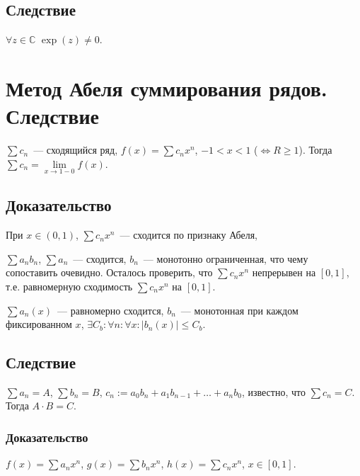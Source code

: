 \documentclass{article}
\begin{document}
        \subsection{Следствие}
        
            $\forall z \in \mathbb{C}$ $\exp(z) \neq 0$.
            
    \newpage
    
    \section{Метод Абеля суммирования рядов. Следствие}
    
        $\sum c_n$~--- сходящийся ряд, $f(x) = \sum c_n x^n$, $-1 < x < 1$ ($\Leftrightarrow R \geq 1$). Тогда $\sum c_n = \lim\limits_{x \rightarrow 1 - 0} f(x)$.
            
        \subsection{Доказательство}
        
            При $x \in (0, 1)$, $\sum c_n x^n$~--- сходится по признаку Абеля,
            
            $\sum a_n b_n$, $\sum a_n$~--- сходится, $b_n$~--- монотонно ограниченная, что чему сопоставить очевидно. Осталось проверить, что $\sum c_n x^n$ непрерывен на $[0, 1]$, т.е. равномерную сходимость $\sum c_n x^n$ на $[0, 1]$.
            
            $\sum a_n(x)$~--- равномерно сходится, $b_n$~--- монотонная при каждом фиксированном $x$, $\exists C_b : \forall n : \forall x : | b_n(x) | \leq C_b$.
            
        \subsection{Следствие}
        
            $\sum a_n = A$, $\sum b_n = B$, $c_n := a_0 b_n + a_1 b_{n - 1} + \ldots + a_n b_0$, известно, что $\sum c_n = C$. Тогда $A \cdot B = C$.
            
            \subsubsection{Доказательство}
            
                $f(x) = \sum a_n x^n$, $g(x) = \sum b_n x^n$, $h(x) = \sum c_n x^n$, $x \in [0, 1]$.
                
\end{document}
